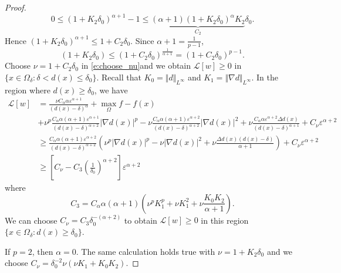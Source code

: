 \documentclass[11pt,reqno]{amsart}
\numberwithin{figure}{section}
\theoremstyle{plain}
\theoremstyle{remark}
\numberwithin{equation}{section}
\begin{document}
\begin{proof}
\begin{equation*}
     0 \leq (1+K_2\delta_0)^{\alpha+1} - 1 \leq\underbrace{(\alpha+1)\left(1+K_2\delta_0\right)^\alpha K_2}_{C_2}\delta_0.
\end{equation*}
Hence $(1+K_2\delta_0)^{\alpha+1} \leq 1 + C_2\delta_0$. Since $\alpha+1 = \frac{1}{p-1}$,
\begin{equation}\label{e:cru1}
    (1+K_2\delta_0) \leq (1+C_2\delta_0)^{\frac{1}{\alpha+1}} = (1+C_2\delta_0)^{p-1}. 
\end{equation}
Choose $\nu = 1+C_2\delta_0$ in \eqref{e:choose_nu}and we obtain $\mathcal{L}[w]\geq 0$ in $\{x\in \Omega_\delta: \delta <d(x)\leq \delta_0\}$. Recall that $K_0 = \Vert d\Vert_{L^\infty}$ and $K_1 = \Vert \nabla d\Vert_{L^\infty}$. In the region where $d(x)\geq \delta_0$, we have 
\begin{align*}
    \mathcal{L}[w] &= \frac{\nu C_\alpha\alpha\varepsilon^{\alpha+1}}{(d(x)-\delta)^\alpha} + \max_{\Omega} f - f(x)\\
    &+  \nu^p\frac{C_\alpha\alpha(\alpha+1)\varepsilon^{\alpha+1}}{(d(x)-\delta)^{\alpha+2}}|\nabla d(x)|^p - \nu \frac{C_\alpha \alpha(\alpha+1)\varepsilon^{\alpha+2}}{(d(x)-\delta)^{\alpha+2}}|\nabla d(x)|^2 
    + \nu \frac{C_\alpha \alpha \varepsilon^{\alpha+2}\Delta d(x)}{(d(x)-\delta)^{\alpha+1}} + C_\nu \varepsilon^{\alpha+2}\\
    &\geq \frac{C_\alpha \alpha(\alpha+1)\varepsilon^{\alpha+2}}{(d(x)-\delta)^{\alpha+2}}\left(\nu^p|\nabla d(x)|^p - \nu |\nabla d(x)|^2 + \nu \frac{\Delta d(x)(d(x)-\delta)}{\alpha+1}\right) + C_\nu \varepsilon^{\alpha+2}\\
    &\geq \left[C_\nu - C_3\left(\frac{1}{\delta_0}\right)^{\alpha+2}\right]\varepsilon^{\alpha+2}
\end{align*}
where 
\begin{equation*}
    C_3 = C_\alpha\alpha(\alpha+1) \left(\nu^pK_1^p + \nu K_1^2 + \nu \frac{K_0K_2}{\alpha+1}\right).
\end{equation*}
We can choose $C_\nu = C_3\delta_0^{-(\alpha+2)}$ to obtain $\mathcal{L}[w]\geq 0$ in this region $\{x\in \Omega_\delta:d(x)\geq \delta_0\}$. 
\smallskip

\noindent
If $p=2$, then $\alpha = 0$. The same calculation holds true with $\nu = 1+K_2\delta_0$ and we choose $C_\nu = \delta_0^{-2}\nu (\nu K_1+K_0K_2)$.
\end{proof}
\end{document}
